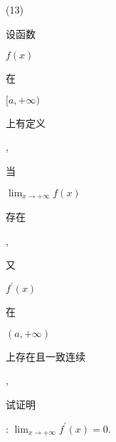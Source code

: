 \documentclass[10pt]{article}
\begin{document}
(13) \begin{CJK}{UTF8}{mj}设函数\end{CJK} $f(x)$ \begin{CJK}{UTF8}{mj}在\end{CJK} $[a,+\infty)$ \begin{CJK}{UTF8}{mj}上有定义\end{CJK}, \begin{CJK}{UTF8}{mj}当\end{CJK} $\lim _{x \rightarrow+\infty} f(x)$ \begin{CJK}{UTF8}{mj}存在\end{CJK}, \begin{CJK}{UTF8}{mj}又\end{CJK} $f^{\prime}(x)$ \begin{CJK}{UTF8}{mj}在\end{CJK} $(a,+\infty)$ \begin{CJK}{UTF8}{mj}上存在且一致连续\end{CJK}, \begin{CJK}{UTF8}{mj}试证明\end{CJK}: $\lim _{x \rightarrow+\infty} f^{\prime}(x)=0 .$
\end{document}
